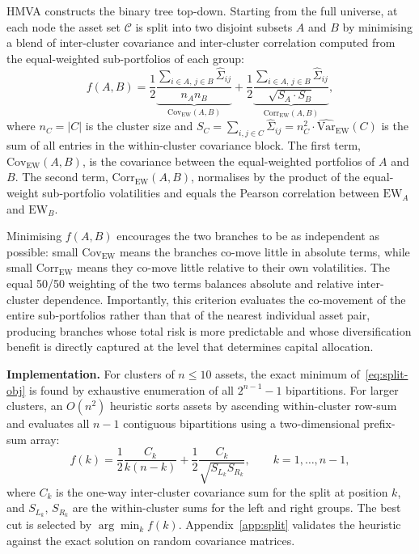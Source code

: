 \documentclass[a4paper,12pt]{report}
\begin{document}
HMVA constructs the binary tree top-down. Starting from the full universe,
at each node the asset set $\mathcal{C}$ is split into two disjoint
subsets $A$ and $B$ by minimising a blend of inter-cluster covariance
and inter-cluster correlation computed from the equal-weighted sub-portfolios
of each group:
\begin{equation}
  f(A, B) =
    \frac{1}{2}\underbrace{\frac{\displaystyle\sum_{i \in A,\, j \in B}
                \hat{\Sigma}_{ij}}{n_A n_B}}_{\displaystyle\mathrm{Cov}_{\mathrm{EW}}(A,B)}
    + \frac{1}{2}\underbrace{\frac{\displaystyle\sum_{i \in A,\, j \in B}
                \hat{\Sigma}_{ij}}{\sqrt{S_A \cdot S_B}}}_{\displaystyle
                \mathrm{Corr}_{\mathrm{EW}}(A,B)},
  \label{eq:split-obj}
\end{equation}
where $n_C = |C|$ is the cluster size and
$S_C = \sum_{i,j \in C}\hat{\Sigma}_{ij} = n_C^2 \cdot \widehat{\mathrm{Var}}_{\mathrm{EW}}(C)$
is the sum of all entries in the within-cluster covariance block.
The first term, $\mathrm{Cov}_{\mathrm{EW}}(A,B)$, is the covariance
between the equal-weighted portfolios of $A$ and $B$. The second term,
$\mathrm{Corr}_{\mathrm{EW}}(A,B)$, normalises by the product of the
equal-weight sub-portfolio volatilities and equals the Pearson correlation
between $\mathrm{EW}_A$ and $\mathrm{EW}_B$.

Minimising $f(A,B)$ encourages the two branches to be as independent as
possible: small $\mathrm{Cov}_{\mathrm{EW}}$ means the branches co-move
little in absolute terms, while small $\mathrm{Corr}_{\mathrm{EW}}$ means
they co-move little relative to their own volatilities. The equal 50/50
weighting of the two terms balances absolute and relative inter-cluster
dependence. Importantly, this criterion evaluates the co-movement of the
entire sub-portfolios rather than that of the nearest individual asset pair,
producing branches whose total risk is more predictable and whose
diversification benefit is directly captured at the level that determines
capital allocation.

\textbf{Implementation.} For clusters of $n \leq 10$ assets, the exact
minimum of~\eqref{eq:split-obj} is found by exhaustive enumeration of all
$2^{n-1} - 1$ bipartitions. For larger clusters, an $O(n^2)$ heuristic sorts
assets by ascending within-cluster row-sum and evaluates all $n-1$ contiguous
bipartitions using a two-dimensional prefix-sum array:
\begin{equation}
  f(k) = \frac{1}{2}\frac{C_k}{k(n-k)} + \frac{1}{2}\frac{C_k}{\sqrt{S_{L_k}S_{R_k}}},
  \qquad k = 1, \ldots, n-1,
  \label{eq:heuristic}
\end{equation}
where $C_k$ is the one-way inter-cluster covariance sum for the split at
position $k$, and $S_{L_k}$, $S_{R_k}$ are the within-cluster sums for the
left and right groups. The best cut is selected by $\arg\min_k f(k)$.
Appendix~\ref{app:split} validates the heuristic against the exact solution
on random covariance matrices.
\end{document}
